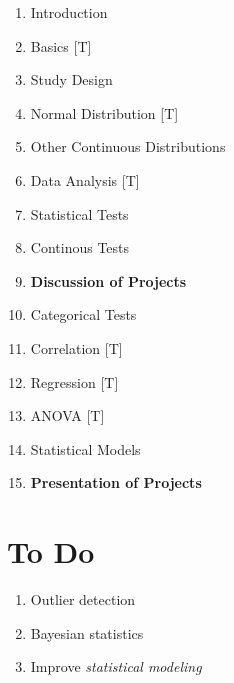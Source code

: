 \begin{enumerate}
  \item Introduction
  \item Basics [T]
  \item Study Design
  \item Normal Distribution [T]
  \item Other Continuous Distributions
  \item Data Analysis [T]
  \item Statistical Tests
  \item Continous Tests
  \item \textbf{Discussion of Projects}
  \item Categorical Tests
  \item Correlation [T]
  \item Regression [T]
  \item ANOVA [T]
  \item Statistical Models
  \item \textbf{Presentation of Projects}
\end{enumerate}

\section{To Do}

\begin{enumerate}
  \item Outlier detection
  \item Bayesian statistics
  \item Improve \emph{statistical modeling}
\end{enumerate}
